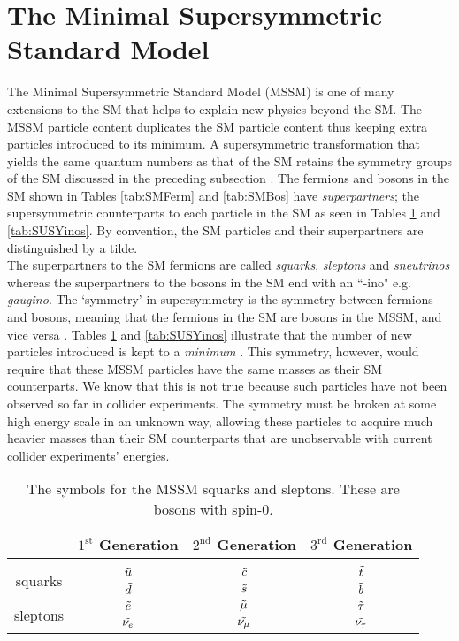 \section{The Minimal Supersymmetric Standard Model}
The Minimal Supersymmetric Standard Model (MSSM) is one of many extensions to the SM that helps to explain new physics beyond the SM. The MSSM particle content duplicates the SM particle content thus keeping extra particles introduced to its minimum. A supersymmetric transformation that yields the same quantum numbers as that of the SM retains the symmetry groups of the SM discussed in the preceding subsection \cite{aitchison2007supersymmetry}. The fermions and bosons in the SM shown in Tables \ref{tab:SMFerm} and \ref{tab:SMBos}  have \textit{superpartners}; the supersymmetric counterparts to each particle in the SM as seen in Tables \ref{tab:SUSYspart} and \ref{tab:SUSYinos}. By convention, the SM particles and their superpartners are distinguished by a tilde. \\

The superpartners to the SM fermions are called \textit{squarks}, \textit{sleptons} and \textit{sneutrinos} whereas the superpartners to the bosons in the SM end with an ``-ino" e.g. \textit{gaugino}. The `symmetry' in supersymmetry is the symmetry between fermions and bosons, meaning that the fermions in the SM are bosons in the MSSM, and vice versa \cite{martin1997supersymmetry}. Tables \ref{tab:SUSYspart} and \ref{tab:SUSYinos} illustrate that the number of new particles introduced is kept to a \textit{minimum} \cite{aitchison2007supersymmetry}. This symmetry, however, would require that these MSSM particles have the same masses as their SM counterparts. We know that this is not true because such particles have not been observed so far in collider experiments. The symmetry must be broken at some high energy scale in an unknown way, allowing these particles to acquire much heavier masses than their SM counterparts that are unobservable with current collider experiments' energies. \\

\begin{table}[htbp]
    \centering
    \begin{tabular}{c||c|c|c}
    \toprule
    & $1^{\text{st}}$ Generation & $2^{\text{nd}}$ Generation & $3^{\text{rd}}$ Generation \\
    \midrule
    & \\[-2.7ex]
    \multirow{2}{1.4cm}{squarks} & $\Tilde{u}$ & $\Tilde{c}$ & \small$\Tilde{t}$ \\
     & $\Tilde{d}$ & $\Tilde{s}$ & $\Tilde{b}$ \\
    \midrule
    
    \multirow{2}{1.4cm}{sleptons} & $\Tilde{e}$ & $\Tilde{\mu}$ & $\Tilde{\tau}$ \\
     & $\Tilde{\nu_e}$ & $\Tilde{\nu_\mu}$ & $\Tilde{\nu_\tau}$ \\
    \bottomrule
    \end{tabular}
    \caption{The symbols for the MSSM squarks and sleptons. These are bosons with spin-0.}
    \label{tab:SUSYspart}
\end{table}

